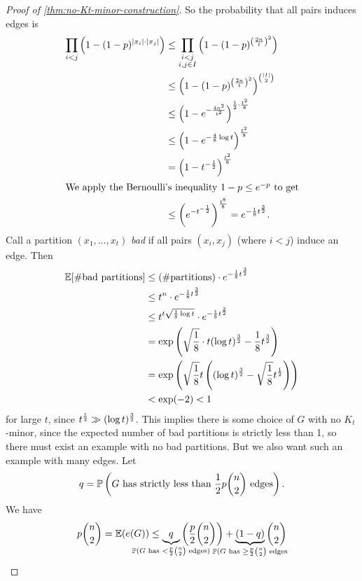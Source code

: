 \documentclass[main.tex]{subfiles}
\begin{document}
\begin{proof}[Proof of \th\ref{thm:no-Kt-minor-construction}]
  So the probability that all pairs induces edges is
  \begin{align*}
    \prod_{i < j}\left(1 - (1-p)^{|x_i|\cdot|x_j|}\right)
    &\leq\prod_{\substack{i < j\\ i,j\in I}}\left(1 - (1-p)^{\left(\frac{2n}{t}\right)^2}\right) \\
    &\leq\left(1 - (1-p)^{\left(\frac{2n}{t}\right)^2}\right)^{\binom{|I|}{2}} \\
    &\leq\left(1 - e^{-\frac{4n^2}{t^2}}\right)^{\frac{1}{2}\cdot\frac{t^2}{8}} \\
    &\leq\left(1 - e^{-\frac{4}{8}\log t}\right)^{\frac{t^2}{8}} \\
    &= \left(1 - t^{-\frac{1}{2}}\right)^{\frac{t^2}{8}} \\
    \intertext{We apply the Bernoulli's inequality $1 - p\leq e^{-p}$ to get}
    &\leq\left(e^{-t^{-\frac{1}{2}}}\right)^{\frac{t^8}{8}}
    = e^{-\frac{1}{8}t^{\frac 3 2}}.
  \end{align*} %
  Call a partition $(x_1,\ldots,x_t)$ \textit{bad} if all pairs $(x_i,x_j)$
  (where $i < j$) induce an edge.
  Then
  \begin{align*}
    \mathbb E[\#\text{bad partitions}]
    &\leq(\#\text{partitions})\cdot e^{-\frac 1 8 t^{\frac 3 2}} \\
    &\leq t^n\cdot e^{-\frac 1 8 t^{\frac 3 2}} \\
    &\leq t^{t\sqrt{\frac 1 8\log t}}\cdot e^{-\frac 1 8t^{\frac 3 2}} \\
    &= \exp\left(\sqrt{\frac 1 8}\cdot t(\log t)^{\frac 3 2} - \frac 1 8 t^{\frac 3 2}\right) \\
    &= \exp\left(\sqrt{\frac 1 8}t\left((\log t)^{\frac 3 2} - \sqrt{\frac 1 8} t^{\frac{1}{2}}\right)\right) \\
    &< \exp(-2) < 1
  \end{align*}
  for large $t$, since $t^{\frac{1}{2}}\gg(\log t)^{\frac 3 2}$.
  This implies there is some choice of $G$ with no $K_t$-minor,
  since the expected number of bad partitions is strictly less than 1,
  so there must exist an example with no bad partitions.
  But we also want such an example with many edges.
  Let
  \[
    q = \mathbb P\left(G\text{ has strictly less than }\frac{1}{2} p\binom{n}{2}\text{ edges}\right).
  \]
  We have
  \[
    p\binom{n}{2} = \bE(e(G))\leq
    \underbrace{q}_{\mathclap{\bP(G\text{ has }<\frac p 2\binom{n}{2}\text{ edges})}}
    \left(\frac p 2\binom{n}{2}\right)
    + \underbrace{(1 - q)}_{\mathclap{\bP(G\text{ has }\geq\frac p 2\binom{n}{2}\text{ edges}}}
    \binom{n}{2}
\]
\end{proof}
\end{document}
